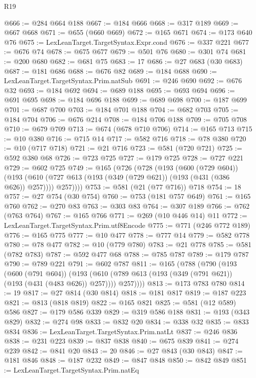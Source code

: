 \begin{lexlean}{R19}
\begin{coremodule}
@666 := @284 @664 @188
@667 := @184 @666
@668 := @317 @189
@669 := @667 @668
@671 := @655 (@660 @669)
@672 := @165 @671
@674 := @173 @640 @76
@675 := LexLeanTarget.TargetSyntax.Expr.cond
@676 := @337 @221
@677 := @676 @74
@678 := @675 @677
@679 := @501 @76
@680 := @301 @74
@681 := @200 @680
@682 := @681 @75
@683 := 17
@686 := @27 @683 (@30 @683)
@687 := @181 @686
@688 := @676 @82
@689 := @184 @688
@690 := LexLeanTarget.TargetSyntax.Prim.natSub
@691 := @246 @690
@692 := @676 @32
@693 := @184 @692
@694 := @689 @188
@695 := @693 @694
@696 := @691 @695
@698 := @184 @696 @188
@699 := @689 @698
@700 := @187 @699
@701 := @687 @700
@703 := @184 @701 @188
@704 := @682 @703
@705 := @184 @704
@706 := @676 @214
@708 := @184 @706 @188
@709 := @705 @708
@710 := @679 @709
@713 := @674 (@678 @710 @706)
@714 := @165 @713
@715 := @10 @380
@716 := @715 @14
@717 := @582 @716
@718 := @78 @380
@720 := @10 (@717 @718)
@721 := @21 @716
@723 := @581 (@720 @721)
@725 := @592 @380 @68
@726 := @723 @725
@727 := @179 @725
@728 := @727 @221
@729 := @602 @725
@749 := @165
    (@726
      (@728
        (@193
          (@600 (@729 @604))
          (@193 (@610 (@727 @613 (@193 (@349 (@729 @621)) (@193 (@431 (@386 @626)) @257)))) @257))))
@753 := @581 (@21 (@77 @716)) @718
@754 := 18
@757 := @27 @754 (@30 @754)
@760 := @753 (@181 @757 @649)
@761 := @165 @760
@762 := @270 @83
@763 := @303 @83
@764 := @307 @189
@766 := @762 (@763 @764)
@767 := @165 @766
@771 := @269 (@10 @446 @14) @11
@772 := LexLeanTarget.TargetSyntax.Prim.utf8Encode
@775 := @771 (@246 @772 @189)
@776 := @165 @775
@777 := @10 @477
@778 := @777 @14
@779 := @582 @778
@780 := @78 @477
@782 := @10 (@779 @780)
@783 := @21 @778
@785 := @581 (@782 @783)
@787 := @592 @477 @68
@788 := @785 @787
@789 := @179 @787
@790 := @789 @221
@791 := @602 @787
@811 := @165
    (@788
      (@790
        (@193
          (@600 (@791 @604))
          (@193 (@610 (@789 @613 (@193 (@349 (@791 @621)) (@193 (@431 (@483 @626)) @257)))) @257))))
@813 := @173 @783 @780
@814 := 19
@817 := @27 @814 (@30 @814)
@818 := @181 @817
@819 := @187 @223
@821 := @813 (@818 @819)
@822 := @165 @821
@825 := @581 (@12 @589) @586
@827 := @179 @586 @339
@829 := @319 @586 @188
@831 := @193 (@343 @829)
@832 := @274 @98
@833 := @832 @20
@834 := @338 @32
@835 := @833 @834
@836 := LexLeanTarget.TargetSyntax.Prim.natLt
@837 := @246 @836
@838 := @231 @223
@839 := @837 @838
@840 := @675 @839
@841 := @274 @239
@842 := @841 @20
@843 := 20
@846 := @27 @843 (@30 @843)
@847 := @181 @846
@848 := @187 @232
@849 := @847 @848
@850 := @842 @849
@851 := LexLeanTarget.TargetSyntax.Prim.natEq

\end{coremodule}
\end{lexlean}
